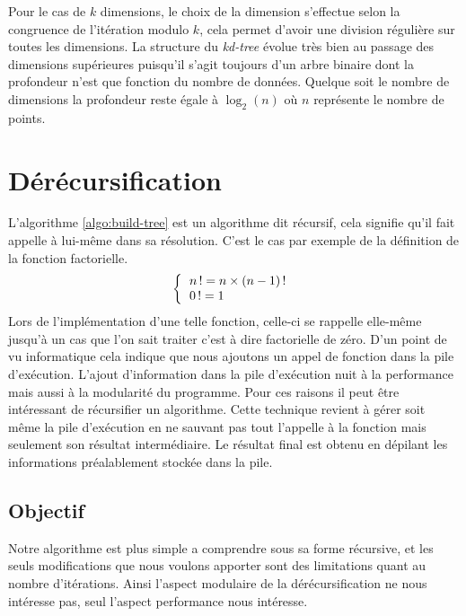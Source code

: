 Pour le cas de $k$ dimensions, le choix de la dimension s'effectue selon la congruence de l'itération modulo $k$, cela permet d'avoir une division régulière sur toutes les dimensions. La structure du \emph{kd-tree} évolue très bien au passage des dimensions supérieures puisqu'il s'agit toujours d'un arbre binaire dont la profondeur n'est que fonction du nombre de données. Quelque soit le nombre de dimensions la profondeur reste égale à $\log_{2}(n)$ où $n$ représente le nombre de points.



\section{Dérécursification}

L'algorithme \ref{algo:build-tree} est un algorithme dit récursif, cela signifie qu'il fait appelle à lui-même dans sa résolution. C'est le cas par exemple de la définition de la fonction factorielle.
	\begin{displaymath}
		\left\{\begin{tabular}{l}
			$n\,! = n \times (n-1)\,!$ \\
			$0\,!= 1$ \\
		\end{tabular}\right.
	\end{displaymath}
Lors de l'implémentation d'une telle fonction, celle-ci se rappelle elle-même jusqu'à un cas que l'on sait traiter c'est à dire factorielle de zéro. D'un point de vu informatique cela indique que nous ajoutons un appel de fonction dans la pile d'exécution. L'ajout d'information dans la pile d'exécution nuit à la performance mais aussi à la modularité du programme. Pour ces raisons il peut être intéressant de récursifier un algorithme. Cette technique revient à gérer soit même la pile d'exécution en ne sauvant pas tout l'appelle à la fonction mais seulement son résultat intermédiaire. Le résultat final est obtenu en dépilant les informations préalablement stockée dans la pile.


	\subsection{Objectif}

Notre algorithme est plus simple a comprendre sous sa forme récursive, et les seuls modifications que nous voulons apporter sont des limitations quant au nombre d'itérations. Ainsi l'aspect modulaire de la dérécursification ne nous intéresse pas, seul l'aspect performance nous intéresse.


